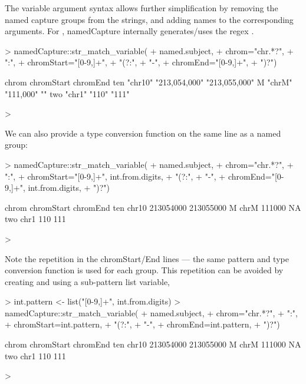The variable argument syntax allows further simplification by removing the named capture groups from the
strings, and adding names to the corresponding arguments. For
, namedCapture internally generates/uses the regex
.

\begin{Schunk}
\begin{Sinput}
> namedCapture::str_match_variable(
+   named.subject, 
+   chrom="chr.*?",
+   ":",
+   chromStart="[0-9,]+",
+   "(?:",
+     "-",
+     chromEnd="[0-9,]+",
+   ")?")
\end{Sinput}
\begin{Soutput}
    chrom   chromStart    chromEnd     
ten "chr10" "213,054,000" "213,055,000"
M   "chrM"  "111,000"     ""           
two "chr1"  "110"         "111"        
\end{Soutput}
\begin{Sinput}
> 
\end{Sinput}
\end{Schunk}

We can also provide a type conversion function on the same line as a named group:

\begin{Schunk}
\begin{Sinput}
> namedCapture::str_match_variable(
+   named.subject, 
+   chrom="chr.*?",
+   ":",
+   chromStart="[0-9,]+", int.from.digits,
+   "(?:",
+     "-",
+     chromEnd="[0-9,]+", int.from.digits,
+   ")?")
\end{Sinput}
\begin{Soutput}
    chrom chromStart  chromEnd
ten chr10  213054000 213055000
M    chrM     111000        NA
two  chr1        110       111
\end{Soutput}
\begin{Sinput}
> 
\end{Sinput}
\end{Schunk}

Note the repetition in the chromStart/End lines --- the same pattern
and type conversion function is used for each group. This repetition
can be avoided by creating and using a sub-pattern list variable,

\begin{Schunk}
\begin{Sinput}
> int.pattern <- list("[0-9,]+", int.from.digits)
> namedCapture::str_match_variable(
+   named.subject, 
+   chrom="chr.*?",
+   ":",
+   chromStart=int.pattern,
+   "(?:",
+     "-",
+     chromEnd=int.pattern,
+   ")?")
\end{Sinput}
\begin{Soutput}
    chrom chromStart  chromEnd
ten chr10  213054000 213055000
M    chrM     111000        NA
two  chr1        110       111
\end{Soutput}
\begin{Sinput}
> 
\end{Sinput}
\end{Schunk}

